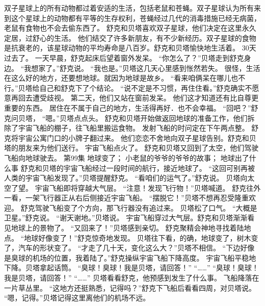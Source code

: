 \documentclass[a4paper,12pt,UTF8,twoside]{ctexbook}
\begin{document}
        双子星球上的所有动物都过着安适的生活，包括老鼠和苍蝇。双子星球认为所有来到这个星球上的动物都有平等的生存权利，苍蝇经过几代的消毒措施已经无病菌，老鼠有食物也不会去偷东西了。 
        舒克和贝塔喜欢双子星球，他们决定在这里永久定居，过舒心的生活。 
        他们结交了许多新朋友，有不少新经历。双子星球的食物是抗衰老的，该星球动物的平均寿命是八百岁。舒克和贝塔愉快地生活着。 
        30天过去了。 
        一天早晨，舒克起床后望着窗外发呆。 
        “你怎么了？”贝塔走到舒克身边。 
        “我想家了。”舒克说。 
        “我也是。”贝塔这几天心里感到怅然若失。 
        很怪，生活在这么好的地方，还要想地球。就因为地球是故乡。 
        “看来咱俩呆在哪儿也不行。”贝塔给自己和舒克下了个结论。 
        “说不定是不习惯，再住住看。”舒克确实不愿意再回去遭受歧视。 
        第二天，他们又站在窗前发呆。 
        他们这才知道还有比自尊更重要的东西。 
        居住在不属于自己的地方，生活得再好．也不会幸福。 
        “回吧？”舒克问贝塔， 
        “嗯。”贝塔点点头。 
        舒克和贝塔开始做返回地球的准备工作，他们拆除了宇宙飞船的棚子，往飞船里搬运食物。 
        发射飞船的时问定在下午两点整。 
        舒克将宇宙公寓门口的小牌子翻过来。 
        他们恋恋不舍地向双子星球告别。舒克和贝塔的朋友来为他们送行。 
        宇宙飞船点火了。 
        舒克和贝塔又回到了太空，他们驾驶飞船向地球驶去。   第99集 
        地球变了； 
        小老鼠的爷爷的爷爷的故事； 
        地球出了什么事   
        舒克和贝塔的宇宙飞船经过一段时间的航行，接近地球了。 
        “这回可别再被人类的宇宙飞船发现了。”贝塔提醒舒克。 
        “看咱们的运气了。”舒克说。 
        贝塔向太空了望。 
        宇宙飞船即将穿越大气层。 
        “注意！发现飞行物！”贝塔喊道。 
        舒克往外一看，一架飞行器正从右后侧接近宇宙飞船。 
        “摆脱它！”贝塔不想再忍受隆重欢迎。 
        舒克驾驶飞船变了个方向，那飞行器没有追过来。 
        贝塔松了口气。 
        “大概是卫星。”舒克说。 
        “谢天谢地。”贝塔说。 
        宇宙飞船穿过大气层。舒克和贝塔渐渐看见地球上的景物了。 
        “又回来了！”贝塔感到亲切。 
        舒克聚精会神地寻找着陆地点。 
        “地球好像变了！”舒克惊奇地发现。 
        贝塔往下看，的确，地球变了，树木变了，汽车的形状变了。 
        “才走了几十天，变化这么大？”贝塔不相信。 
        “下边好像是臭球的机场的位置，我着陆了。”舒克操纵宇宙飞船下降高度。 
        宇宙飞船平稳地下降。贝塔拿起话筒。 
        “臭球！臭球！我是贝塔，请回答！” 
        “……” 
        “臭球！臭球！我是贝塔，请回答！” 
        “……” 
        贝塔看看舒克，他预感到发生了什么事。 
        飞船降落在一片草丛里。 
        “这地方还挺熟悉，记得吗？”舒克下飞船后看看四周，对贝塔说。 
        “嗯，记得。”贝塔记得这里离他们的机场不远。 
\end{document}

